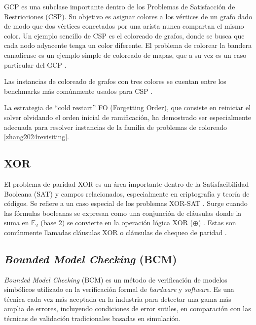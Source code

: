 GCP es una subclase importante dentro de los Problemas de Satisfacción de Restricciones (CSP). Su objetivo es asignar colores a los vértices de un grafo dado de modo que dos vértices conectados por una arista nunca compartan el mismo color. Un ejemplo sencillo de CSP es el coloreado de grafos, donde se busca que cada nodo adyacente tenga un color diferente. El problema de colorear la bandera canadiense es un ejemplo simple de coloreado de mapas, que a su vez es un caso particular del GCP \cite{hoos1998sat}. %

Las instancias de coloreado de grafos con tres colores se cuentan entre los benchmarks más comúnmente usados para CSP \cite{hoos1998sat}. %

La estrategia de “cold restart” FO (Forgetting Order), que consiste en reiniciar el solver olvidando el orden inicial de ramificación, ha demostrado ser especialmente adecuada para resolver instancias de la familia de problemas de coloreado \ref{zhang2024revisiting}. %

\subsection{XOR}
\label{subsec:xor}
El problema de paridad XOR es un área importante dentro de la Satisfacibilidad Booleana (SAT) y campos relacionados, especialmente en criptografía y teoría de códigos. Se refiere a un caso especial de los problemas XOR-SAT \cite{nandi2024margin}. %
Surge cuando las fórmulas booleanas se expresan como una conjunción de cláusulas donde la suma en $\mathbb{F}_2$ (base 2) se convierte en la operación lógica XOR ($\oplus$) \cite{trimoska2020parity}. %
Estas son comúnmente llamadas cláusulas XOR o cláusulas de chequeo de paridad \cite{nandi2024margin}. %

\subsection{\textit{Bounded Model Checking} (BCM)}
\label{subsec:bcm}
\textit{Bounded Model Checking} (BCM) es un método de verificación de modelos simbólicos utilizado en la verificación formal de \textit{hardware} y \textit{software}. Es una técnica cada vez más aceptada en la industria para detectar una gama más amplia de errores, incluyendo condiciones de error sutiles, en comparación con las técnicas de validación tradicionales basadas en simulación.


